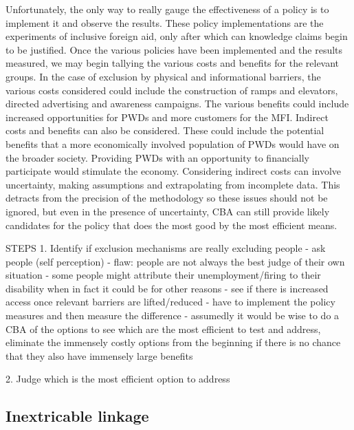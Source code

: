 \documentclass[a4paper]{article}
\begin{document}
Unfortunately, the only way to really gauge the effectiveness of a policy is
to implement it and observe the results. These policy implementations are the
experiments of inclusive foreign aid, only after which can knowledge claims
begin to be justified. Once the various policies have been implemented and
the results measured, we may begin tallying the various costs and benefits for
the relevant groups. In the case of exclusion by physical and informational
barriers, the various costs considered could include the construction of ramps
and elevators, directed advertising and awareness campaigns. The various
benefits could include increased opportunities for PWDs and more customers for
the MFI. Indirect costs and benefits can also be considered. These could
include the potential benefits that a more economically involved population of
PWDs would have on the broader society. Providing PWDs with an opportunity to
financially participate would stimulate the economy. Considering indirect
costs can involve uncertainty, making assumptions and extrapolating from
incomplete data. This detracts from the precision of the methodology so these
issues should not be ignored, but even in the presence of uncertainty, CBA can
still provide likely candidates for the policy that does the most good by the
most efficient means.





STEPS
1. Identify if exclusion mechanisms are really excluding people
    - ask people (self perception)
        - flaw: people are not always the best judge of their own situation
            - some people might attribute their unemployment/firing to their
            disability when in fact it could be for other reasons
    - see if there is increased access once relevant barriers are
      lifted/reduced
        - have to implement the policy measures and then measure the
          difference
        - assumedly it would be wise to do a CBA of the options to see which
        are the most efficient to test and address, eliminate the immensely
        costly options from the beginning if there is no chance that they also
        have immensely large benefits

2. Judge which is the most efficient option to address



\subsection{Inextricable linkage}
\end{document}
